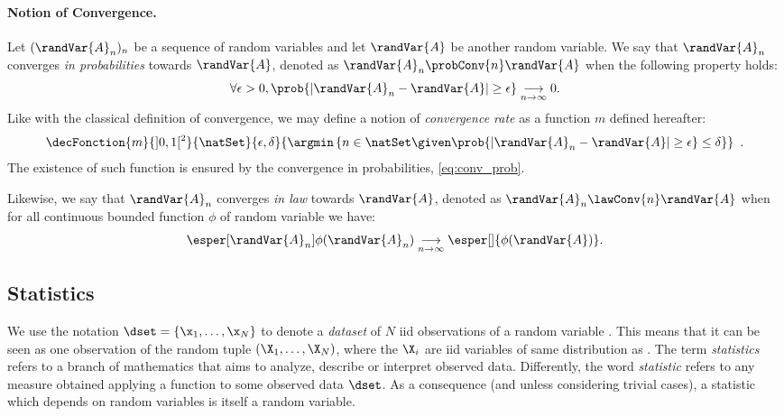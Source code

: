 \paragraph{Notion of Convergence.}
Let \((\randVar{A}_n)_n\) be a sequence of random variables and let \(\randVar{A}\) be another
random variable.
We say that \(\randVar{A}_n\) converges \emph{in probabilities} towards \(\randVar{A}\), denoted as
\mbox{\(\randVar{A}_n \probConv{n} \randVar{A}\)} when the following property holds:
\begin{equation}
	\forall \epsilon > 0, \prob{ \lvert \randVar{A}_n - \randVar{A} \rvert \geq \epsilon}
	\underset{n \to \infty}{\longrightarrow} 0.
    \label{eq:conv_prob}
\end{equation}
Like with the classical definition of convergence, we may define a notion of \emph{convergence rate} as a function \(m\) defined hereafter:
\begin{equation}
    \decFonction{m}{]0,1[^2}{\natSet}{\epsilon, \delta}{\argmin\left\{n \in \natSet \given \prob{ \lvert \randVar{A}_n - \randVar{A} \rvert \geq \epsilon} \leq \delta\right\}} \enspace .
    \label{eq:conv_rate}
\end{equation}
The existence of such function is ensured by the convergence in probabilities, \ie{} \autoref{eq:conv_prob}.

Likewise, we say that \(\randVar{A}_n\) converges \emph{in law} towards \(\randVar{A}\), denoted as \(\randVar{A}_n \lawConv{n} \randVar{A}\) when for all continuous bounded function \(\phi\) of random variable we have:
\begin{equation}
    \esper[\randVar{A}_n]{\phi(\randVar{A}_n)} \underset{n \to \infty}{\longrightarrow} \esper[]{\phi(\randVar{A})}.
\end{equation}

\subsection{Statistics}
We use the notation \(\dset = \{\x_1, \ldots, \x_N\}\) to denote a \emph{dataset} of \(N\) \gls{iid} observations of a random variable \X.
This means that it can be seen as one observation of the random tuple \((\X_1, \ldots, \X_N)\), where the \(\X_i\) are \gls{iid} variables of same distribution as \X.
The term \emph{statistics} refers to a branch of mathematics that aims to analyze, describe or interpret observed data.
Differently, the word \emph{statistic} refers to any measure obtained applying a function to some observed data \(\dset\).
As a consequence (and unless considering trivial cases), a statistic which depends on random variables is itself a random variable.

